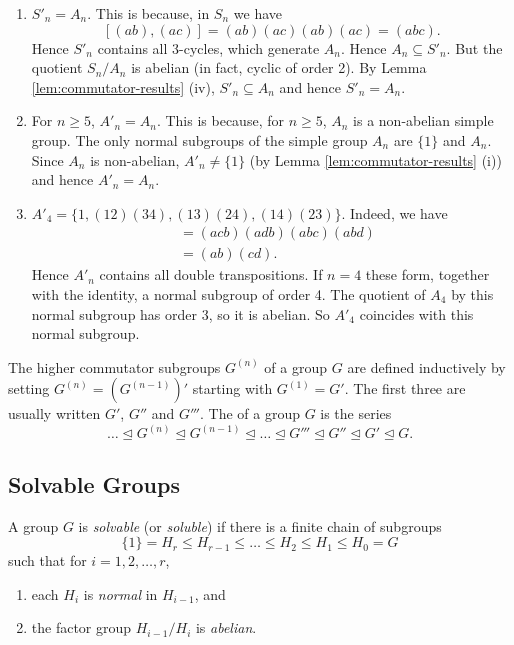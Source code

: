 \begin{examples}\label{eg:commutator-subgroups}\hfill
	\begin{enumerate}
		\item $S'_n = A_n$. This is because, in $S_n$ we have
		\[
			[(ab), (ac)] = (ab)(ac)(ab)(ac) = (abc).
		\]
		Hence $S'_n$ contains all 3-cycles, which generate $A_n$. Hence $A_n \subseteq S'_n$. But the quotient $S_n / A_n$ is abelian (in fact, cyclic of order 2). By Lemma \ref{lem:commutator-results} (iv), $S'_n \subseteq A_n$ and hence $S'_n = A_n$.
		\item For $n \geq 5$, $A'_n = A_n$. This is because, for $n \geq 5$, $A_n$ is a non-abelian simple group. The only normal subgroups of the simple group $A_n$ are $\{1\}$ and $A_n$. Since $A_n$ is non-abelian, $A'_n \neq \{1\}$ (by Lemma \ref{lem:commutator-results} (i)) and hence $A'_n = A_n$.
		\item $A'_4 = \{1, (12)(34), (13)(24), (14)(23)\}$. Indeed, we have
		\begin{align*}
			[(abc), (abd)] &= (acb)(adb)(abc)(abd) \\
				&= (ab)(cd).
		\end{align*}
		Hence $A'_n$ contains all double transpositions. If $n = 4$ these form, together with the identity, a normal subgroup of order 4. The quotient of $A_4$ by this normal subgroup has order 3, so it is abelian. So $A'_4$ coincides with this normal subgroup.
	\end{enumerate}
\end{examples}

\begin{definition}
	The higher commutator subgroups $G^{(n)}$ of a group $G$ are defined inductively by setting $G^{(n)} = (G^{(n - 1)})'$ starting with $G^{(1)} = G'$. The first three are usually written $G'$, $G''$ and $G'''$. The  of a group $G$ is the series
\[
	\dots \unlhd G^{(n)} \unlhd G^{(n - 1)} \unlhd \dots \unlhd G''' \unlhd G'' \unlhd G' \unlhd G.
\]
\end{definition}

\subsection{Solvable Groups}
\begin{definition}
	A group $G$ is \emph{solvable} (or \emph{soluble}) if there is a finite chain of subgroups
	\begin{equation}\label{eq:chain-10}
		\{1\} = H_r \leq H_{r - 1} \leq \dots \leq H_2 \leq H_1 \leq H_0 = G
	\end{equation}
	such that for $i = 1, 2, \dots, r$,
	\begin{enumerate}
		\item each $H_i$ is \emph{normal} in $H_{i - 1}$, and
		\item the factor group $H_{i - 1} / H_i$ is \emph{abelian}.
	\end{enumerate}
\end{definition}

